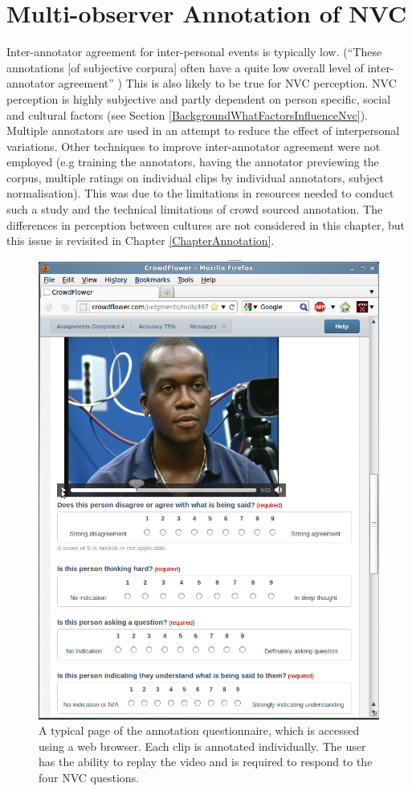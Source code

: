 
\section{Multi-observer Annotation of NVC}
\label{SectionMultiCultitureAnnotation}

Inter-annotator agreement for inter-personal events is typically low. (``These annotations [of subjective corpura] often have a quite low overall level of inter-annotator agreement'' \cite{Reidsma2008}) This is also likely to be true for \ac{NVC} perception. \ac{NVC} perception is highly subjective and partly dependent on person specific, social and cultural factors (see Section \ref{BackgroundWhatFactorsInfluenceNvc}). Multiple annotators are used in an attempt to reduce the effect of interpersonal variations. Other techniques to improve inter-annotator agreement were not employed (e.g training the annotators, having the annotator previewing the corpus, multiple ratings on individual clips by individual annotators, subject normalisation). This was due to the limitations in resources needed to conduct such a study and the technical limitations of crowd sourced annotation.
The differences in perception between cultures are not considered in this chapter, but this issue is revisited in Chapter \ref{ChapterAnnotation}.

\begin{figure}[tb]
\centering
\includegraphics[width = 0.5 \columnwidth]{corpus/crowdflower-survey.png}
\caption[A typical page of the annotation questionnaire, which is accessed using a web browser.]{A typical page of the annotation questionnaire, which is accessed using a web browser. Each clip is annotated individually. The user has the ability to replay the video and is required to respond to the four \ac{NVC} questions.}
\label{FigureAnnotationSurveyScreenshot}
\end{figure}

